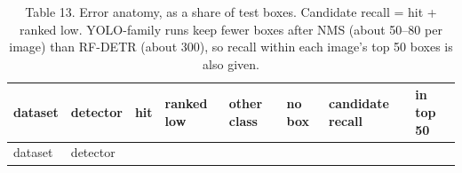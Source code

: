 \documentclass[
  10pt,
]{article}
\begin{document}
\begin{longtable}[]{@{}
  >{\raggedright\arraybackslash}p{}
  >{\raggedright\arraybackslash}p{}
  >{\raggedright\arraybackslash}p{}
  >{\raggedright\arraybackslash}p{}
  >{\raggedright\arraybackslash}p{}
  >{\raggedright\arraybackslash}p{}
  >{\raggedright\arraybackslash}p{}
  >{\raggedright\arraybackslash}p{}@{}}
\caption{Table 13. Error anatomy, as a share of test boxes. Candidate
recall = hit + ranked low. YOLO-family runs keep fewer boxes after NMS
(about 50--80 per image) than RF-DETR (about 300), so recall within each
image's top 50 boxes is also given.}\tabularnewline
\toprule\noalign{}
\begin{minipage}[b]{\linewidth}\raggedright
dataset
\end{minipage} & \begin{minipage}[b]{\linewidth}\raggedright
detector
\end{minipage} & \begin{minipage}[b]{\linewidth}\raggedright
hit
\end{minipage} & \begin{minipage}[b]{\linewidth}\raggedright
ranked low
\end{minipage} & \begin{minipage}[b]{\linewidth}\raggedright
other class
\end{minipage} & \begin{minipage}[b]{\linewidth}\raggedright
no box
\end{minipage} & \begin{minipage}[b]{\linewidth}\raggedright
candidate recall
\end{minipage} & \begin{minipage}[b]{\linewidth}\raggedright
in top 50
\end{minipage} \\
\midrule\noalign{}
\endfirsthead
\toprule\noalign{}
\begin{minipage}[b]{\linewidth}\raggedright
dataset
\end{minipage} & \begin{minipage}[b]{\linewidth}\raggedright
detector
\end{minipage} & \begin{minipage}[b]{\linewidth}\raggedright

\end{minipage}
\end{longtable}
\end{document}

